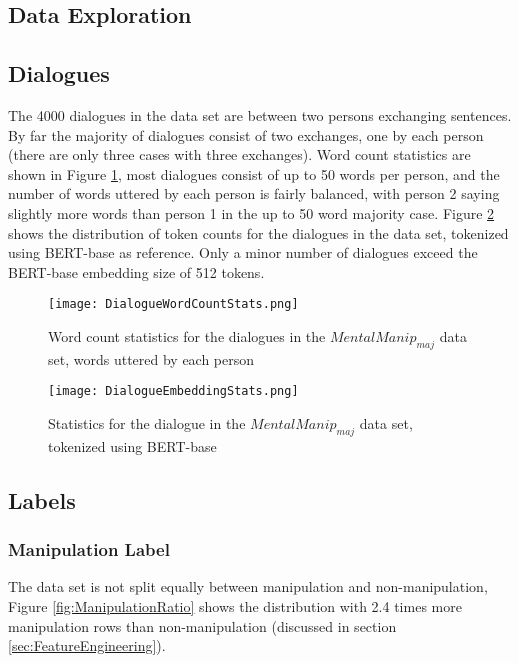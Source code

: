 \documentclass[
	letterpaper, %
	12pt, %
	unnumberedsections, %
	twoside, %
]{LTJournalArticle}
\begin{document}
\subsection{Data Exploration}\label{sec:DataExploration}

\subsection{Dialogues}
The 4000 dialogues in the data set are between two persons exchanging sentences. By far the majority of dialogues consist of two exchanges, one by each person (there are only three cases with three exchanges). Word count statistics are shown in Figure \ref{fig:DialogueWordCount}, most dialogues consist of up to 50 words per person, and the number of words uttered by each person is fairly balanced, with person 2 saying slightly more words than person 1 in the up to 50 word majority case. Figure \ref{fig:DialogueEmbedding} shows the distribution of token counts for the dialogues in the data set, tokenized using BERT-base as reference. Only a minor number of dialogues exceed the BERT-base embedding size of 512 tokens.


\begin{figure}[!htp] %
	\centering
	\texttt{[image: DialogueWordCountStats.png]}
	\caption{Word count statistics for the dialogues in the $MentalManip_{maj}$ data set, words uttered by each person}
	\label{fig:DialogueWordCount}
\end{figure}

\begin{figure}[!htp] %
	\centering
	\texttt{[image: DialogueEmbeddingStats.png]}
	\caption{Statistics for the dialogue in the $MentalManip_{maj}$ data set, tokenized using BERT-base}
	\label{fig:DialogueEmbedding}
\end{figure}


\subsection{Labels}

\subsubsection{Manipulation Label}
The data set is not split equally between manipulation and non-manipulation, Figure \ref{fig:ManipulationRatio} shows the distribution with 2.4 times more manipulation rows than non-manipulation (discussed in section \ref{sec:FeatureEngineering}).
\end{document}
